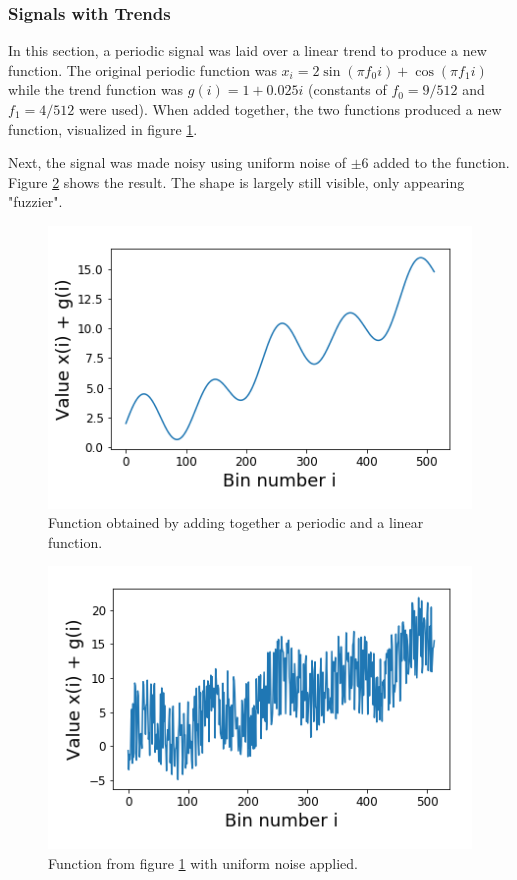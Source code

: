 \documentclass[twocolumn]{article}
\begin{document}
\subsubsection{Signals with Trends}
In this section, a periodic signal was laid over a linear trend to produce a new function. The original periodic function was $x_i = 2\sin(\pi f_0 i) + \cos( \pi f_1 i)$ while the trend function was $g(i) = 1 + 0.025i$ (constants of $f_0 = 9/512$ and $f_1=4/512$ were used). When added together, the two functions produced a new function, visualized in figure \ref{fig:trend}.

Next, the signal was made noisy using uniform noise of $\pm6$ added to the function. Figure \ref{fig:trendy} shows the result. The shape is largely still visible, only appearing "fuzzier".

\begin{figure}[t]
\centering
\includegraphics[width=\linewidth]{trend}
\caption{Function obtained by adding together a periodic and a linear function.}
\label{fig:trend}
\end{figure}

\begin{figure}
\centering
\includegraphics[width=\linewidth]{noise_trend}
\caption{Function from figure \ref{fig:trend} with uniform noise applied.}
\label{fig:trendy}
\end{figure}
\end{document}

